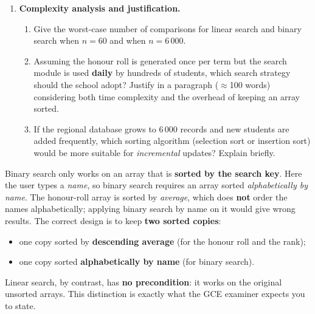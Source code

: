\documentclass[11pt]{article}
\newcounter{popsec}
\newcounter{popsub}
\newcommand{\courssub}[1]{%
  \stepcounter{popsub}%
  \par\vspace{9pt}\noindent{\popxbold\fontsize{11.5}{13}\selectfont\color{popink}{\color{poporange}\thepopsec.\thepopsub}\hspace{6pt}#1}\par\nopagebreak\vspace{4pt}
}
\begin{document}
\begin{enumerate}
    \item \textbf{Complexity analysis and justification.}
    \begin{enumerate}
        \item Give the worst-case number of comparisons for linear search and binary search when $n = 60$ and when $n = 6\,000$.
        \item Assuming the honour roll is generated once per term but the search module is used \textbf{daily} by hundreds of students, which search strategy should the school adopt? Justify in a paragraph ($\approx$100 words) considering both time complexity and the overhead of keeping an array sorted.
        \item If the regional database grows to 6\,000 records and new students are added frequently, which sorting algorithm (selection sort or insertion sort) would be more suitable for \emph{incremental} updates? Explain briefly.
    \end{enumerate}
\end{enumerate}

\courssub{Model answer}

\begin{attention}
Binary search only works on an array that is \textbf{sorted by the search key}. Here the user types a \emph{name}, so binary search requires an array sorted \emph{alphabetically by name}. The honour-roll array is sorted by \emph{average}, which does \textbf{not} order the names alphabetically; applying binary search by name on it would give wrong results. The correct design is to keep \textbf{two sorted copies}:
\begin{itemize}
    \item one copy sorted by \textbf{descending average} (for the honour roll and the rank);
    \item one copy sorted \textbf{alphabetically by name} (for binary search).
\end{itemize}
Linear search, by contrast, has \textbf{no precondition}: it works on the original unsorted arrays. This distinction is exactly what the GCE examiner expects you to state.
\end{attention}
\end{document}

